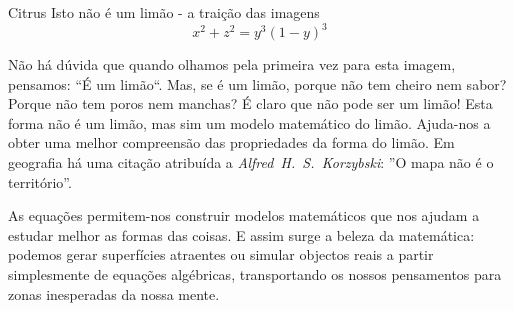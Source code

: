 \begin{surferPage}{Citrus}
Isto n\~ao \'e um lim\~ao - a trai\c c\~ao das imagens\\
\smallskip
\[x^2 + z^2 = y^3 (1 - y)^3\] 

\singlespacing
N\~ao h\'a d\'uvida que quando olhamos pela primeira vez para esta imagem, pensamos: ``\'E um lim\~ao``. Mas, se \'e um lim\~ao, porque  n\~ao tem cheiro nem sabor? Porque n\~ao tem poros nem manchas? \'E claro que n\~ao pode ser um lim\~ao!
\singlespacing
Esta forma n\~ao \'e um lim\~ao, mas sim um modelo matem\'atico do lim\~ao. Ajuda-nos a obter uma melhor compreens\~ao das propriedades da forma do lim\~ao. Em geografia h\'a uma cita\c c\~ao atribu\'ida a {\it Alfred\ H.\ S.\ Korzybski}: ''O mapa n\~ao \'e o territ\'orio''. \\
\singlespacing

As equa\c c\~oes permitem-nos construir modelos matem\'aticos que nos ajudam a estudar melhor as formas das coisas. 
\singlespacing
E assim surge a beleza da matem\'atica: podemos gerar superf\'icies atraentes ou simular objectos reais a partir simplesmente de equa\c c\~oes alg\'ebricas, transportando os nossos pensamentos para zonas inesperadas da nossa mente.
\end{surferPage}
